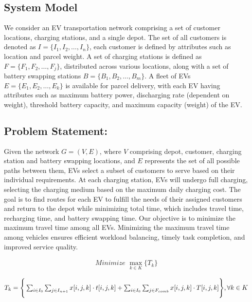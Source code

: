\documentclass[conference]{IEEEtran}
\begin{document}
\subsection{System Model}  \label{sec:model1} 
\vspace{-0.1cm}
We consider an EV transportation network comprising a set of customer locations,  charging stations, and a single depot. The set of all customers is denoted as $I = \{I_1, I_2, \ldots, I_n\}$, each customer is defined by attributes such as location and parcel weight. A set of charging stations is defined as $F = \{F_1 , F_2 , \ldots, F_j\}$, distributed across various locations, along with a set of battery swapping stations $B=\{B_1, B_2, \ldots, B_m\}$. A fleet of EVs  $E=\{E_1, E_2, \ldots, E_k\}$  is available for parcel delivery, with each EV having attributes such as maximum battery power, discharging rate (dependent on weight), threshold battery capacity, and maximum capacity (weight) of the EV.



\subsection{Problem Statement:}
Given the network $G=(V,E)$, where $V$ comprising depot, customer, charging station  and battery swapping locations, and $E$ represents the set of all possible paths between them, EVs select a subset of customers to serve based on their individual requirements.
 At each charging station, EVs will undergo full charging, selecting the charging medium based on the maximum daily charging cost. The goal is to find routes for each EV to fulfill the needs of their assigned customers and return to the depot while minimizing total time, which includes travel time, recharging time, and battery swapping time. Our objective is to minimize the maximum travel time among all EVs. Minimizing the maximum travel time among vehicles ensures efficient workload balancing, timely task completion, and improved service quality.

\begin{eqnarray}\label{Constraint 1}
   \textit{Minimize } \max_{k \in K} \{T_k\} 
\end{eqnarray}


$T_k=\Bigg\{ \sum_{i \in I_{0}} \sum_{ j \in I_{n+1}} x[i, j, k] \cdot t[i, j, k] \\
 + \sum_{i \in I_{0}} \sum_{j \in F_{comb} } x[i, j, k] \cdot T[i,j, k] \Bigg\} , \forall k \in K$
\end{document}
